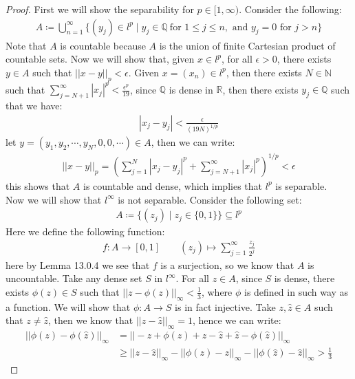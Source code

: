\documentclass[11pt]{book}
\theoremstyle{break}
\theoremstyle{break}
\newcommand{\R}{\mathbb{R}}
\newcommand{\N}{\mathbb{N}}
\newcommand{\Q}{\mathbb{Q}}
\begin{document}
\begin{proof}
First we will show the separability for $p \in [1,\infty)$. Consider the following:
\begin{align*}
A \coloneqq \bigcup_{n=1}^\infty \{ (y_j) \in l^p \mid y_j \in \Q\ \text{for } 1\leq j \leq n,\text{ and }y_j=0 \text{ for }j>n\}
\end{align*}
Note that $A$ is countable because $A$ is the union of finite Cartesian product of countable sets. Now we will show that, given $x \in l^p$, for all $\epsilon>0$, there exists $y \in A$ such that $||x-y||_p < \epsilon$. Given $x =(x_n)\in l^p$, then there exists $N \in \N$ such that $\sum_{j=N+1}^\infty  |x_j|^p < \frac{\epsilon^p}{19}$, since $\Q$ is dense in $\R$, then there exists $y_j \in \Q$ such that we have:
\begin{align*}
|x_j - y_j| < \frac{\epsilon}{(19N)^{1/p}}
\end{align*}
let $y = (y_1,y_2,\cdots, y_N, 0, 0,\cdots) \in A$, then we can write:
\begin{align*}
||x-y||_p = \left( \sum_{j=1}^N |x_j - y_j|^p + \sum_{j=N+1}^\infty |x_j|^p \right)^{1/p} < \epsilon
\end{align*}
this shows that $A$ is countable and dense, which implies that $l^p$ is separable. \\
Now we will show that $l^\infty$ is not separable. Consider the following set:
\begin{align*}
A \coloneqq\{ (z_j) \mid z_j \in \{0,1\}\} \subseteq l^p
\end{align*}
Here we define the following function:
\begin{align*}
f:A \to [0,1] \qquad (z_j)\mapsto \sum_{j=1}^\infty \frac{z_j}{2^j}
\end{align*}
here by Lemma 13.0.4 we see that $f$ is a surjection, so we know that $A$ is uncountable. Take any dense set $S$ in $l^\infty$. For all $z\in A$, since $S$ is dense, there exists $\phi(z)\in S$ such that $||z - \phi(z)||_{\infty} < \frac{1}{3}$, where $\phi$ is defined in such way as a function. We will show that $\phi:A \to S$ is in fact injective. Take $z,\hat{z}\in A$ such that $z \neq \hat{z}$, then we know that $||z- \hat{z}||_{\infty} = 1$, hence we can write:
\begin{align*}
||\phi(z) -\phi(\hat{z})||_{\infty} 
&= ||-z + \phi(z) + z - \hat{z} + \hat{z} - \phi(\hat{z})||_{\infty}\\
&\geq ||z - \hat{z}||_{\infty} - || \phi(z) - z||_{\infty} - ||\phi(\hat{z}) - \hat{z}||_{\infty} > \frac{1}{3}
\end{align*}

\end{proof}
\end{document}
